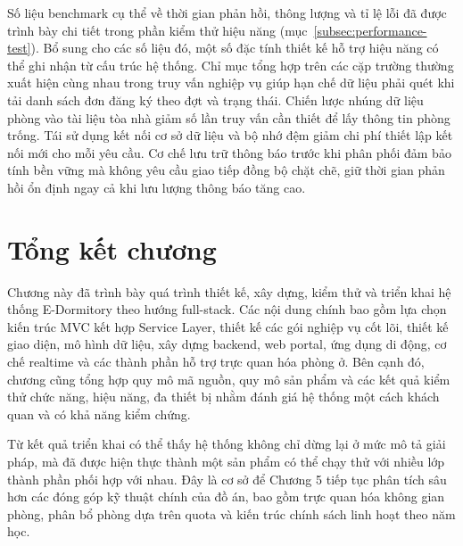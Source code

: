 \documentclass[../DoAn.tex]{subfiles}
\begin{document}
Số liệu benchmark cụ thể về thời gian phản hồi, thông lượng và tỉ lệ lỗi đã được
trình bày chi tiết trong phần kiểm thử hiệu năng (mục~\ref{subsec:performance-test}).
Bổ sung cho các số liệu đó, một số đặc tính thiết kế hỗ trợ hiệu năng có thể ghi
nhận từ cấu trúc hệ thống.
Chỉ mục tổng hợp trên các cặp trường thường xuất hiện cùng nhau trong truy vấn
nghiệp vụ giúp hạn chế dữ liệu phải quét khi tải danh sách đơn đăng ký theo
đợt và trạng thái. Chiến lược nhúng dữ liệu phòng vào tài liệu tòa nhà giảm
số lần truy vấn cần thiết để lấy thông tin phòng trống. Tái sử dụng kết nối
cơ sở dữ liệu và bộ nhớ đệm giảm chi phí thiết lập kết nối mới cho mỗi yêu
cầu. Cơ chế lưu trữ thông báo trước khi phân phối đảm bảo tính bền vững mà
không yêu cầu giao tiếp đồng bộ chặt chẽ, giữ thời gian phản hồi ổn định
ngay cả khi lưu lượng thông báo tăng cao.

\section{Tổng kết chương}
\label{sec:chapter4_summary}

Chương này đã trình bày quá trình thiết kế, xây dựng, kiểm thử và triển khai
hệ thống E-Dormitory theo hướng full-stack. Các nội dung chính bao gồm lựa chọn
kiến trúc MVC kết hợp Service Layer, thiết kế các gói nghiệp vụ cốt lõi, thiết
kế giao diện, mô hình dữ liệu, xây dựng backend, web portal, ứng dụng di động,
cơ chế realtime và các thành phần hỗ trợ trực quan hóa phòng ở. Bên cạnh đó,
chương cũng tổng hợp quy mô mã nguồn, quy mô sản phẩm và các kết quả kiểm thử
chức năng, hiệu năng, đa thiết bị nhằm đánh giá hệ thống một cách khách quan và
có khả năng kiểm chứng.

Từ kết quả triển khai có thể thấy hệ thống không chỉ dừng lại ở mức mô tả giải
pháp, mà đã được hiện thực thành một sản phẩm có thể chạy thử với nhiều lớp
thành phần phối hợp với nhau. Đây là cơ sở để Chương 5 tiếp tục phân tích sâu
hơn các đóng góp kỹ thuật chính của đồ án, bao gồm trực quan hóa không gian
phòng, phân bổ phòng dựa trên quota và kiến trúc chính sách linh hoạt theo năm
học.
\end{document}
